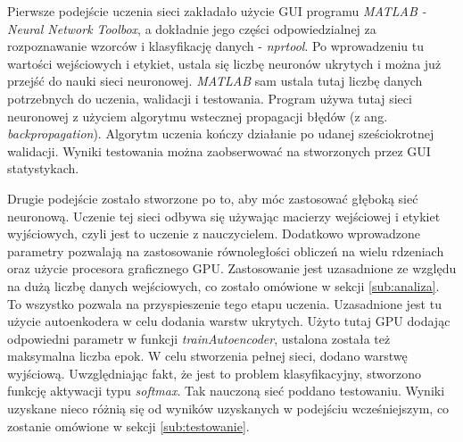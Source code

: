 Pierwsze podejście uczenia sieci zakładało użycie GUI programu \textit{MATLAB - Neural Network Toolbox}, a dokładnie jego części odpowiedzialnej za rozpoznawanie wzorców i klasyfikację danych - \textit{nprtool}. Po wprowadzeniu tu wartości wejściowych i etykiet, ustala się liczbę neuronów ukrytych i można już przejść do nauki sieci neuronowej. \textit{MATLAB} sam ustala tutaj liczbę danych potrzebnych do uczenia, walidacji i testowania. Program używa tutaj sieci neuronowej z użyciem algorytmu wstecznej propagacji błędów (z ang. \textit{backpropagation}). Algorytm uczenia kończy działanie po udanej sześciokrotnej walidacji. Wyniki testowania można zaobserwować na stworzonych przez GUI statystykach.

Drugie podejście zostało stworzone po to, aby móc zastosować głęboką sieć neuronową. Uczenie tej sieci odbywa się używając macierzy wejściowej i etykiet wyjściowych, czyli jest to uczenie z nauczycielem. Dodatkowo wprowadzone parametry pozwalają na zastosowanie równoległości obliczeń na wielu rdzeniach oraz użycie procesora graficznego GPU. Zastosowanie jest uzasadnione ze względu na dużą liczbę danych wejściowych, co zostało omówione w sekcji \ref{sub:analiza}. To wszystko pozwala na przyspieszenie tego etapu uczenia. Uzasadnione jest tu użycie autoenkodera w celu dodania warstw ukrytych. Użyto tutaj GPU dodając odpowiedni parametr w funkcji \textit{trainAutoencoder}, ustalona została też maksymalna liczba epok. W celu stworzenia pełnej sieci, dodano warstwę wyjściową. Uwzględniając fakt, że jest to problem klasyfikacyjny, stworzono funkcję aktywacji typu \textit{softmax}. Tak nauczoną sieć poddano testowaniu. Wyniki uzyskane nieco różnią się od wyników uzyskanych w podejściu wcześniejszym, co zostanie omówione w sekcji \ref{sub:testowanie}.



